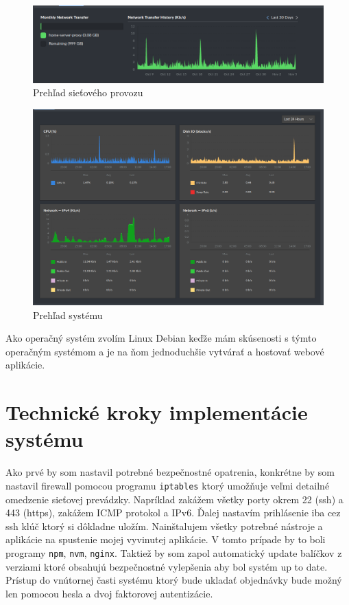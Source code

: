 \begin{figure}[ht!]
  \includegraphics[width=\linewidth]{images/3.png}
  \caption{Prehľad sieťového provozu}
  \label{img:three}
\end{figure}

\begin{figure}[ht!]
  \includegraphics[width=\linewidth]{images/4.png}
  \caption{Prehľad systému}
  \label{img:four}
\end{figure}

Ako operačný systém zvolím Linux Debian keďže mám skúsenosti s týmto operačným systémom a je na ňom jednoduchšie vytvárať a hostovať webové aplikácie.

\section{Technické kroky implementácie systému}

Ako prvé by som nastavil potrebné bezpečnostné opatrenia, konkrétne by som nastavil firewall pomocou programu \texttt{iptables} ktorý umožňuje veľmi detailné omedzenie sieťovej prevádzky. Napríklad zakážem všetky porty okrem 22 (ssh) a 443 (https), zakážem ICMP protokol a IPv6. Ďalej nastavím prihlásenie iba cez ssh klúč ktorý si dôkladne uložím. Nainštalujem všetky potrebné nástroje a aplikácie na spustenie mojej vyvinutej aplikácie. V tomto prípade by to boli programy \texttt{npm}, \texttt{nvm}, \texttt{nginx}. Taktiež by som zapol automatický update balíčkov z verziami ktoré obsahujú bezpečnostné vylepšenia aby bol systém up to date. Prístup do vnútornej časti systému ktorý bude ukladať objednávky bude možný len pomocou hesla a dvoj faktorovej autentizácie.

